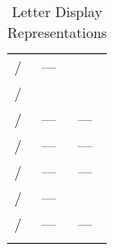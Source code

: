 \begin{longtabu}{ X[1,c,m] X[1,c,m] X[1,c,m] }
  \large{} / \large{} & --- &  \\ 
  \large{} / \large{} &  &  \\ 
  \large{} / \large{} & --- & --- \\ 
  \large{} / \large{} & --- & --- \\ 
  \large{} / \large{} & --- & --- \\ 
  \large{} / \large{} & --- &  \\ 
  \large{} / \large{} & --- & --- \\

  \bhrule
  \caption{Letter Display Representations}
\end{longtabu}
